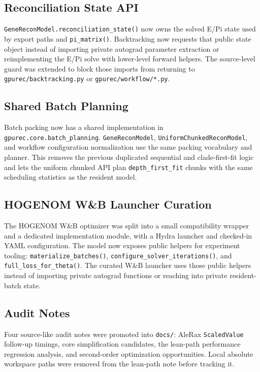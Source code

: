 \documentclass[11pt]{article}
\begin{document}
\subsection{Reconciliation State API}

\texttt{GeneReconModel.reconciliation\_state()} now owns the solved E/Pi state
used by export paths and \texttt{pi\_matrix()}.  Backtracking now requests that
public state object instead of importing private autograd parameter extraction
or reimplementing the E/Pi solve with lower-level forward helpers.  The
source-level guard was extended to block those imports from returning to
\texttt{gpurec/backtracking.py} or \texttt{gpurec/workflow/*.py}.

\subsection{Shared Batch Planning}

Batch packing now has a shared implementation in
\texttt{gpurec.core.batch\_planning}.  \texttt{GeneReconModel},
\texttt{UniformChunkedReconModel}, and workflow configuration normalization use
the same packing vocabulary and planner.  This removes the previous duplicated
sequential and clade-first-fit logic and lets the uniform chunked API plan
\texttt{depth\_first\_fit} chunks with the same scheduling statistics as the
resident model.

\subsection{HOGENOM W\&B Launcher Curation}

The HOGENOM W\&B optimizer was split into a small compatibility wrapper and a
dedicated implementation module, with a Hydra launcher and checked-in YAML
configuration.  The model now exposes public helpers for experiment tooling:
\texttt{materialize\_batches()}, \texttt{configure\_solver\_iterations()}, and
\texttt{full\_loss\_for\_theta()}.  The curated W\&B launcher uses those public
helpers instead of importing private autograd functions or reaching into private
resident-batch state.

\subsection{Audit Notes}

Four source-like audit notes were promoted into \texttt{docs/}: AleRax
\texttt{ScaledValue} follow-up timings, core simplification candidates, the
lean-path performance regression analysis, and second-order optimization
opportunities.  Local absolute workspace paths were removed from the lean-path
note before tracking it.
\end{document}
